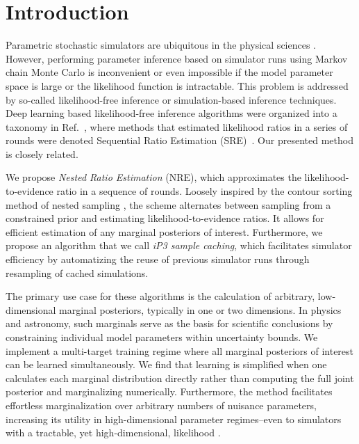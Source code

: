 
\section{Introduction}

Parametric stochastic simulators are ubiquitous in the physical sciences \cite{Banik_2018, Bartels_2016, Rodr_guez_Puebla_2016}.  However, performing parameter inference based on simulator runs using Markov chain Monte Carlo is inconvenient or even impossible if the model parameter space is large or the likelihood function is intractable.  This problem is addressed by so-called likelihood-free inference \cite{sisson2018handbook} or simulation-based inference \cite{Cranmer2020} techniques. Deep learning based likelihood-free inference algorithms were organized into a taxonomy in Ref.~\cite{Durkan2020}, where methods that estimated likelihood ratios in a series of rounds were denoted Sequential Ratio Estimation (SRE)~\cite{Hermans2019}. Our presented method is closely related.

We propose \emph{Nested Ratio Estimation} (NRE), which approximates the likelihood-to-evidence ratio in a sequence of rounds. Loosely inspired by the contour sorting method of nested sampling \cite{Skilling2006, Feroz2008, Handley2015}, the scheme alternates between sampling from a constrained prior and estimating likelihood-to-evidence ratios. It allows for efficient estimation of any marginal posteriors of interest. Furthermore, we propose an algorithm that we call \emph{iP3 sample caching}, which facilitates simulator efficiency by automatizing the reuse of previous simulator runs through resampling of cached simulations.

The primary use case for these algorithms is the calculation of arbitrary, low-dimensional marginal posteriors, typically in one or two dimensions. In physics and astronomy, such marginals serve as the basis for scientific conclusions by constraining individual model parameters within uncertainty bounds. 
We implement a multi-target training regime where all marginal posteriors of interest can be learned simultaneously.  We find that learning is simplified when one calculates each marginal distribution directly rather than computing the full joint posterior and marginalizing numerically.  
Furthermore, the method facilitates effortless marginalization over arbitrary numbers of nuisance parameters, increasing its utility in high-dimensional parameter regimes--even to simulators with a tractable, yet high-dimensional, likelihood \cite{lensing}.


